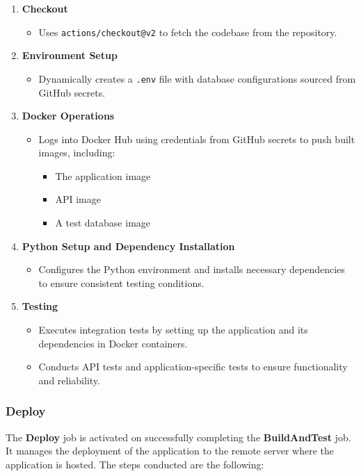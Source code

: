 \documentclass[12pt, a4paper, oneside]{book}
\begin{document}
\begin{enumerate}
    \item \textbf{Checkout} 
    \begin{itemize}
        \item Uses \texttt{actions/checkout@v2} to fetch the codebase from the repository.
    \end{itemize}
    
    \item \textbf{Environment Setup} 
    \begin{itemize}
        \item Dynamically creates a \texttt{.env} file with database configurations sourced from GitHub secrets.
    \end{itemize}
    
    \item \textbf{Docker Operations}
    \begin{itemize}
        \item Logs into Docker Hub using credentials from GitHub secrets to push built images, including:
        \begin{itemize}
            \item The application image
            \item API image
            \item A test database image
        \end{itemize}
    \end{itemize}
    
    \item \textbf{Python Setup and Dependency Installation}
    \begin{itemize}
        \item Configures the Python environment and installs necessary dependencies to ensure consistent testing conditions.
    \end{itemize}
    
    \item \textbf{Testing}
    \begin{itemize}
        \item Executes integration tests by setting up the application and its dependencies in Docker containers.
        \item Conducts API tests and application-specific tests to ensure functionality and reliability.
    \end{itemize}
\end{enumerate}

\subsubsection{Deploy}
The \textbf{Deploy} job is activated on successfully completing the \textbf{BuildAndTest} job.
It manages the deployment of the application to the remote server where the application is hosted.
The steps conducted are the following:
\end{document}
